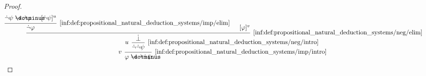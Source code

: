 \begin{proof}
  \begin{equation*}
    \begin{prooftree}
      \hypo{ \synneg \psi \synimplies \synneg \varphi }
      \hypo{ [\synneg \psi]^u }
      \infer2[\ref{inf:def:propositional_natural_deduction_systems/imp/elim}]{ \synneg \varphi }

      \hypo{ [\varphi]^v }
      \infer2[\ref{inf:def:propositional_natural_deduction_systems/neg/elim}]{ \synbot }

      \infer[left label=\( u \)]1[\ref{inf:def:propositional_natural_deduction_systems/neg/intro}]{ \synneg \synneg \psi }
      \infer[left label=\( v \)]1[\ref{inf:def:propositional_natural_deduction_systems/imp/intro}]{ \varphi \synimplies \synneg \synneg \psi }
    \end{prooftree}
  \end{equation*}
\end{proof}

